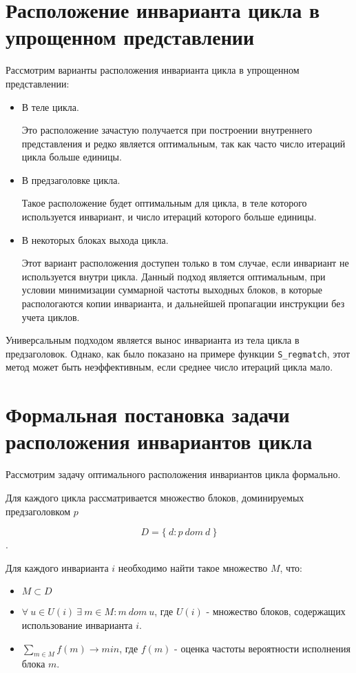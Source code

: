 \section{Расположение инварианта цикла в упрощенном представлении}

Рассмотрим варианты расположения инварианта цикла в упрощенном представлении:
\begin{itemize}
    \item В теле цикла.

        Это расположение зачастую получается при построении внутреннего представления и редко является оптимальным, так как часто число итераций цикла больше единицы.

    \item В предзаголовке цикла.

        Такое расположение будет оптимальным для цикла, в теле которого используется инвариант, и число итераций которого больше единицы.

    \item В некоторых блоках выхода цикла.

        Этот вариант расположения доступен только в том случае, если инвариант не используется внутри цикла.
        Данный подход является оптимальным, при условии минимизации суммарной частоты выходных блоков, в которые распологаются копии инварианта, и дальнейшей пропагации инструкции без учета циклов.
\end{itemize}

Универсальным подходом является вынос инварианта из тела цикла в предзаголовок.
Однако, как было показано на примере функции \texttt{S\_regmatch}, этот метод может быть неэффективным, если среднее число итераций цикла мало.

\section{Формальная постановка задачи расположения инвариантов цикла}

Рассмотрим задачу оптимального расположения инвариантов цикла формально.

Для каждого цикла рассматривается множество блоков, доминируемых предзаголовком $p$

$$D = \{ \: d : p \: dom \: d \: \}$$.

Для каждого инварианта $i$ необходимо найти такое множество $M$, что:
\begin{itemize}
    \item $M \subset D$
    \item $\forall \: u \in U(i) \: \exists \: m \in M : m \: dom \: u $, где $U(i)$ - множество блоков, содержащих использование инварианта $i$.
    \item $\sum_{m \in M}{f(m)} \to min $, где $f(m)$ - оценка частоты вероятности исполнения блока $m$.
\end{itemize}
\newpage
